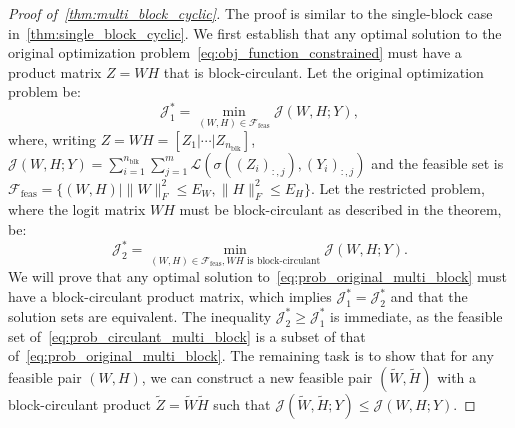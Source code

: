 \documentclass[11pt]{article}
\begin{document}
\begin{proof}[Proof of~\cref{thm:multi_block_cyclic}]
The proof is similar to the single-block case in~\cref{thm:single_block_cyclic}. We first establish that any optimal solution to the original optimization problem~\cref{eq:obj_function_constrained} must have a product matrix \(Z=WH\) that is block-circulant. Let the original optimization problem be:
\begin{equation} \label{eq:prob_original_multi_block}
\mathcal J_1^* = \min_{(W,H) \in \mathcal{F}_{\mathrm{feas}} } \mathcal J(W,H;Y),
\end{equation}
where, writing \(Z=WH=[Z_1|\cdots|Z_{n_{\mathrm{blk}}}]\), \(\mathcal J(W,H;Y) = \sum_{i=1}^{n_{\mathrm{blk}}} \sum_{j=1}^{m}\mathcal L(\sigma((Z_i)_{:,j}), (Y_i)_{:,j})\) and the feasible set is \(\mathcal{F}_{\mathrm{feas}}  = \{(W,H) \mid \|W\|_F^2\le E_W, \|H\|_F^2\le E_H\}\). Let the restricted problem, where the logit matrix \(WH\) must be block-circulant as described in the theorem, be:
\begin{equation} \label{eq:prob_circulant_multi_block}
\mathcal J_2^* = \min_{(W,H) \in \mathcal{F}_{\mathrm{feas}} , WH \text{ is block-circulant}} \mathcal J(W,H;Y).
\end{equation}
We will prove that any optimal solution to~\cref{eq:prob_original_multi_block} must have a block-circulant product matrix, which implies \(\mathcal J_1^* = \mathcal J_2^*\) and that the solution sets are equivalent. The inequality \(\mathcal J_2^* \ge \mathcal J_1^*\) is immediate, as the feasible set of~\cref{eq:prob_circulant_multi_block} is a subset of that of~\cref{eq:prob_original_multi_block}. The remaining task is to show that for any feasible pair \((W,H)\), we can construct a new feasible pair \((\widetilde{W}, \widetilde{H})\) with a block-circulant product \(\widetilde{Z}=\widetilde{W}\widetilde{H}\) such that \(\mathcal J(\widetilde{W},\widetilde{H};Y) \le \mathcal J(W,H;Y)\).


\end{proof}
\end{document}
